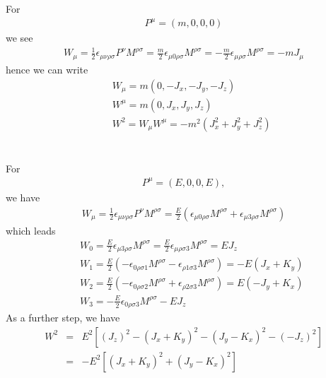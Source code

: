 \documentclass[11pt]{article}
\begin{document}
\section{ }
For 
\begin{eqnarray}
  P^\mu=(m,0,0,0)
\end{eqnarray}
we see
\begin{eqnarray}
W_\mu = \frac{1}{2} \epsilon_{\mu\nu\rho\sigma} P^\nu M^{\rho\sigma} =\frac{m}{2}\epsilon_{\mu 0 \rho\sigma} M^{\rho\sigma}=-\frac{m}{2}\epsilon_{\mu  \rho\sigma} M^{\rho\sigma}=- m J_\mu
\end{eqnarray}
hence we can write
\begin{eqnarray}
  && W_\mu = m ( 0, -J_x, -J_y, -J_z )  \\
  && W^\mu = m ( 0,  J_x,  J_y,  J_z )  \\
  && W^2   = W_\mu W^\mu=- m^2 ( J_x^2 + J_y^2 + J_z^2 )
\end{eqnarray}

\section{ }
For 
\begin{eqnarray}
  P^\mu=(E,0,0,E),
\end{eqnarray}
we have
\begin{eqnarray}
  W_\mu = \frac{1}{2} \epsilon_{\mu\nu\rho\sigma} P^\nu M^{\rho\sigma} =\frac{E}{2}(\epsilon_{\mu 0 \rho\sigma} M^{\rho\sigma}+\epsilon_{\mu 3 \rho\sigma} M^{\rho\sigma})
\end{eqnarray}
which leads
\begin{eqnarray}
  && W_0=\frac{E}{2}\epsilon_{\mu 3 \rho\sigma} M^{\rho\sigma}=\frac{E}{2}\epsilon_{\mu \rho\sigma 3} M^{\rho\sigma} = EJ_z \\
  && W_1= \frac{E}{2}(-\epsilon_{ 0 \rho\sigma 1} M^{\rho\sigma}-\epsilon_{ \rho 1 \sigma3} M^{\rho\sigma})=-E(J_x+K_y)\\
  &&W_2=\frac{E}{2}(-\epsilon_{ 0 \rho\sigma 2} M^{\rho\sigma}+\epsilon_{ \rho 2 \sigma 3} M^{\rho\sigma}) =E(-J_y+K_x)\\
  &&W_3=-\frac{E}{2}\epsilon_{0 \rho\sigma 3} M^{\rho\sigma} -EJ_z 
\end{eqnarray}
As a further step,
we have 
\begin{eqnarray}
  W^2 &=&  E^2 [ (J_z)^2 - (J_x+K_y)^2 - (J_y-K_x)^2 -(-J_z)^2 ] \nonumber \\
  &=& -E^2 [ (J_x+K_y)^2 + (J_y-K_x)^2 ]
 \end{eqnarray}
\end{document}
